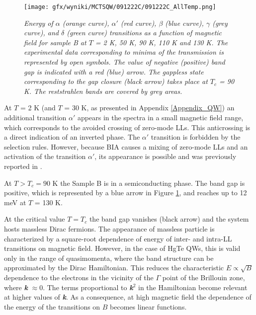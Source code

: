 \documentclass[titlepage,a4paper]{book}
\begin{document}
\begin{figure}[ht]
	\centering
	\texttt{[image: gfx/wyniki/MCTSQW/091222C/091222C\_AllTemp.png]}
	\vspace{-10pt}
	\caption{\textit{Energy of $\alpha$ (orange curve), $\alpha'$ (red curve), $\beta$ (blue curve), $\gamma$ (grey curve), and $\delta$ (green curve) transitions as a function of magnetic field for sample B at $T$ = 2 K, 50 K, 90 K, 110 K and 130 K. The experimental data corresponding to minima of the transmission is represented by open symbols. The value of negative (positive) band gap is indicated with a red (blue) arrow. The gappless state corresponding to the gap closure (black arrow) takes place at $T_c$ = 90 K. The reststrahlen bands are covered by grey areas.}}
	\label{fig:091222C_AllTemp}
\end{figure}

At $T$ = 2 K (and $T$ = 30 K, as presented in Appendix \ref{Appendix_QW}) an additional transition $\alpha'$ appears in the spectra in a small magnetic field range, which corresponds to the avoided crossing of zero-mode LLs. This anticrossing is a direct indication of an inverted phase. The $\alpha'$ transition is forbidden by the selection rules. However, because BIA causes a mixing of zero-mode LLs and an activation of the transition $\alpha'$, its appearance is possible and was previously reported in \cite{Orlita_MCT_QW}\cite{Zholudev_MCT_QW}\cite{Zholudev_MCT_QW_anticrossing}.

At $T > T_c = 90$ K the Sample B is in a semiconducting phase. The band gap is positive, which is represented by a blue arrow in Figure \ref{fig:091222C_AllTemp}, and reaches up to 12 meV at $T$ = 130 K. 

At the critical value $T = T_c$ the band gap vanishes (black arrow) and the system hosts massless Dirac fermions. The appearance of massless particle is characterized by a square-root dependence of energy of inter- and intra-LL transitions on magnetic field. However, in the case of HgTe QWs, this is valid only in the range of quasimomenta, where the band structure can be approximated by the Dirac Hamiltonian. This reduces the characteristic $E \propto \sqrt{B}$ dependence to the electrons in the vicinity of the $\Gamma$ point of the Brillouin zone, where \textbf{\textit{k}} $\approx 0$. The terms proportional to \textbf{\textit{k}}$^2$ in the Hamiltonian become relevant at higher values of \textbf{\textit{k}}. As a consequence, at high magnetic field the dependence of the energy of the transitions on $B$ becomes linear functions. 
\end{document}
